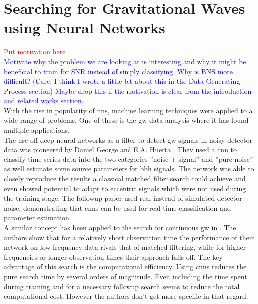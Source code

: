 \section{Searching for Gravitational Waves using Neural Networks}
\textcolor{red}{Put motivation here}\\
\textcolor{blue}{Motivate why the problem we are looking at is interesting and why it might be beneficial to train for SNR instead of simply classifying. Why is BNS more difficult? (Care, I think I wrote a little bit about this in the Data Generating Process section) Maybe drop this if the motivation is clear from the introduction and related works section.}\\
With the rise in popularity of \gls{nns}, machine learning techniques were applied to a wide range of problems. One of these is the \gls{gw} data-analysis where it has found multiple applications.\\
The use off deep neural networks as a filter to detect \gls{gw}-signals in noisy detector data was pioneered by Daniel George and E.A. Huerta \cite{original_deep_filtering}. They used a \gls{cnn} to classify time series data into the two categories ''noise + signal'' and ''pure noise'' as well estimate some source parameters for \gls{bbh} signals. The network was able to closely reproduce the results a classical matched filter search could achieve and even showed potential to adapt to eccentric signals which were not used during the training stage. The followup paper \cite{huerta_parameter_estimation} used real instead of simulated detector noise, demonstrating that \gls{cnns} can be used for real time classification and parameter estimation.\\
A similar concept has been applied to the search for continuous \gls{gw} in \cite{paper_christoph}. The authors show that for a relatively short observation time the performance of their network on low frequency data rivals that of matched filtering, while for higher frequencies or longer observation times their approach falls off. The key advantage of this search is the computational efficiency. Using \gls{cnns} reduces the pure search time by several orders of magnitude. Even including the time spent during training and for a necessary followup search seems to reduce the total computational cost. However the authors don't get more specific in that regard.\\
